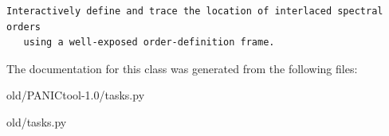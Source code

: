 \footnotesize\begin{verbatim}Interactively define and trace the location of interlaced spectral orders
   using a well-exposed order-definition frame. 
\end{verbatim}
\normalsize
 



The documentation for this class was generated from the following files:\begin{CompactItemize}
\item 
old/PANICtool-1.0/tasks.py\item 
old/tasks.py\end{CompactItemize}
